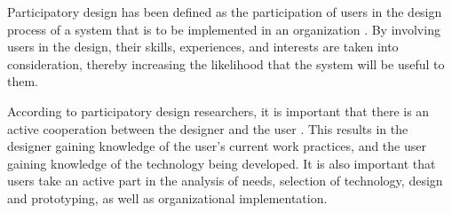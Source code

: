 







Participatory design has been defined as the participation of users in the design process of a system that is to be implemented in an organization \cite{kensing_participatory_1998}. By involving users in the design, their skills, experiences, and interests are taken into consideration, thereby increasing the likelihood that the system will be useful to them.

According to participatory design researchers, it is important that there is an active cooperation between the designer and the user \cite{kensing_participatory_1998}. This results in the designer gaining knowledge of the user's current work practices, and the user gaining knowledge of the technology being developed. It is also important that users take an active part in the analysis of needs, selection of technology, design and prototyping, as well as organizational implementation.